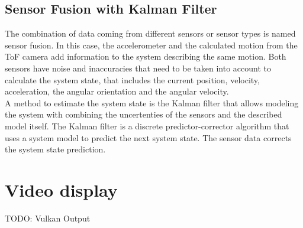 \subsection{Sensor Fusion with Kalman Filter}
\label{sec:SensorFusion}
The combination of data coming from different sensors or sensor types is named sensor fusion. In this case, the accelerometer and the calculated motion from the ToF camera add information to the system describing the same motion. Both sensors have noise and inaccuracies that need to be taken into account to calculate the system state, that includes the current position, velocity, acceleration, the angular orientation and the angular velocity.\\
A method to estimate the system state is the Kalman filter that allows modeling the system with combining the uncertenties of the sensors and the described model itself. The Kalman filter is a discrete predictor-corrector algorithm that uses a system model to predict the next system state. The sensor data corrects the system state prediction.
\section{Video display}
\label{sec:VideoDisplay}
TODO: Vulkan Output